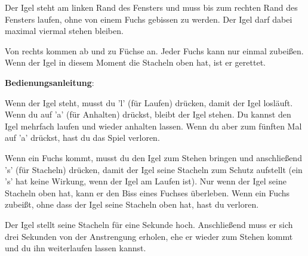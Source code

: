 Der Igel steht am linken Rand des Fensters und muss bis zum rechten Rand des
Fensters laufen, ohne von einem Fuchs gebissen zu werden. Der Igel darf dabei
maximal viermal stehen bleiben.

Von rechts kommen ab und zu Füchse an. Jeder Fuchs kann nur einmal zubeißen.
Wenn der Igel in diesem Moment die Stacheln oben hat, ist er gerettet.

\textbf{Bedienungsanleitung}:

Wenn der Igel steht, musst du 'l' (für Laufen) drücken, damit der Igel
losläuft. Wenn du auf 'a' (für Anhalten) drückst, bleibt der Igel stehen. Du
kannst den Igel mehrfach laufen und wieder anhalten lassen. Wenn du aber zum
fünften Mal auf 'a' drückst, hast du das Spiel verloren.

Wenn ein Fuchs kommt, musst du den Igel zum Stehen bringen und anschließend 's'
(für Stacheln) drücken, damit der Igel seine Stacheln zum Schutz aufstellt (ein
's' hat keine Wirkung, wenn der Igel am Laufen ist). Nur wenn der Igel seine
Stacheln oben hat, kann er den Biss eines Fuchses überleben. Wenn ein Fuchs
zubeißt, ohne dass der Igel seine Stacheln oben hat, hast du verloren.

Der Igel stellt seine Stacheln für eine Sekunde hoch. Anschließend muss er sich
drei Sekunden von der Anstrengung erholen, ehe er wieder zum Stehen kommt und du
ihn weiterlaufen lassen kannst.
